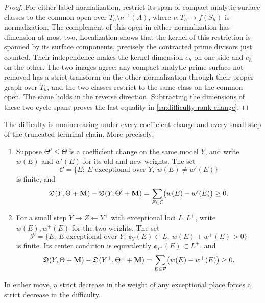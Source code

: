 \begin{proof}
For either label normalization, restrict its span of compact analytic
surface classes to the common open over \(T_h\setminus\nu^{-1}(A)\),
where \(\nu:T_h\to f(S_h)\) is normalization.  The complement of this
open in either normalization has dimension at most two.  Localization shows that the kernel of this
restriction is spanned by its surface components, precisely the contracted
prime divisors just counted.  Their independence makes the kernel dimension
\(e_h\) on one side and \(e_h^+\) on the other.  The two images agree:
any compact analytic prime surface not removed has a strict transform on
the other normalization through their proper graph over \(T_h\), and the
two classes restrict to the same class on the common open.  The same holds
in the reverse direction.  Subtracting the dimensions of these two cycle
spans proves the last equality in \eqref{eq:difficulty-rank-change}.
\end{proof}

\begin{proposition}\label{prop:difficulty-change}
The difficulty is nonincreasing under every coefficient change and every
small step of the truncated terminal chain.  More precisely:
\begin{enumerate}
\item Suppose \(\Theta'\leq\Theta\) is a coefficient change on the same
model \(Y\), and write \(w(E)\) and \(w'(E)\) for its old and new weights.
The set
\[
 \mathcal C=\{E:\ E\text{ exceptional over }Y,\ w(E)\ne w'(E)\}
\]
is finite, and
\begin{equation}\label{eq:difficulty-coefficient-change}
 \mathfrak D(Y,\Theta+\mathbf{M})-\mathfrak D(Y,\Theta'+\mathbf{M})
 =\sum_{E\in\mathcal C}\bigl(w(E)-w'(E)\bigr)\geq0.
\end{equation}
\item For a small step \(Y\to Z\leftarrow Y^+\) with exceptional loci
\(L,L^+\), write \(w(E),w^+(E)\) for the two weights.  The set
\[
 \mathcal P=\{E:\ E\text{ exceptional over }Y,\
       \cent_Y(E)\subset L,\ w(E)+w^+(E)>0\}
\]
is finite.  Its center condition is equivalently
\(\cent_{Y^+}(E)\subset L^+\), and
\begin{equation}\label{eq:difficulty-small-change}
 \mathfrak D(Y,\Theta+\mathbf{M})-\mathfrak D(Y^+,\Theta^++\mathbf{M})
 =\sum_{E\in\mathcal P}\bigl(w(E)-w^+(E)\bigr)\geq0.
\end{equation}
\end{enumerate}
In either move, a strict decrease in the weight of any exceptional place
forces a strict decrease in the difficulty.
\end{proposition}

